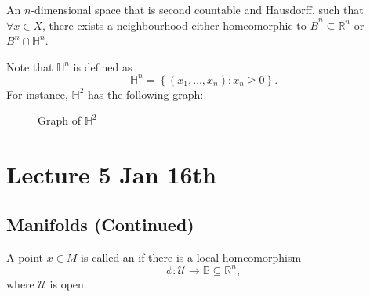\documentclass[notoc,notitlepage]{tufte-book}
\begin{document}
\begin{defn}\label{defn:manifold_with_boundary}
  An $n$-dimensional space that is second countable and Hausdorff, such that $\forall x \in X$,
  there exists a neighbourhood either homeomorphic to $\bar{B}^n \subseteq \mathbb{R}^n$ or
  $B^n \cap \mathbb{H}^n$.
\end{defn}

\begin{note}
  Note that $\mathbb{H}^n$ is defined as
  \begin{equation*}
    \mathbb{H}^n = \left\{ ( x_1, \ldots, x_n ) : x_n \geq 0 \right\}.
  \end{equation*}
  For instance, $\mathbb{H}^2$ has the following graph:
  \begin{figure}[ht]
    \centering
    \caption{Graph of $\mathbb{H}^2$}
    \label{fig:graph_of_h_2}
  \end{figure}
\end{note}



%
\label{prt:introduction_to_topological_manifolds}

\chapter{Lecture 5 Jan 16th}%
\label{chp:lecture_5_jan_16th}

\section{Manifolds (Continued)}%
\label{sec:manifolds_continued}

\begin{defn}\label{defn:interior_point}
  A point $x \in M$ is called an  if there is a local
  homeomorphism
  \begin{equation*}
    \phi : \mathcal{U} \to \mathbb{B} \subseteq \mathbb{R}^n,
  \end{equation*}
  where $\mathcal{U}$ is open.
\end{defn}
\end{document}
